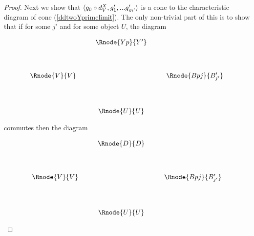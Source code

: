 \documentclass[10pt,a4paper]{scrartcl}
\begin{document}
\begin{proof}
\noindent
Next we show that $\langle g_0 \circ d^{X}_{V},g'_1,...g'_{m'}\rangle$ is a cone to the characteristic diagram of cone (\ref{ddtwoYprimelimit}). The only non-trivial part of this is to show that if for some $j'$ and for some object $U$, the diagram
\begin{center}
\begin{equation}
\label{ddtwoYpdiamond}
\begin{array}{cp{0.3cm}c    p{0.3cm}  c }
               & & \Rnode{Yp}{Y'} & &                                  \\ [1.3cm]
\Rnode{V}{V}   &&                               & & \Rnode{Bpj}{B'_{j'}}   \\ [1.4cm]
               & & \Rnode{U}{U} & &   
\end{array}
\end{equation}
\end{center}

commutes
then the diagram

\begin{center}
\begin{equation}
\label{ddtwoDdiamond}
\begin{array}{cp{0.3cm}c    p{0.3cm}  c }
               & & \Rnode{D}{D} & &                                  \\ [1.3cm]
\Rnode{V}{V}   &&                               & & \Rnode{Bpj}{B'_{j'}}   \\ [1.4cm]
               & & \Rnode{U}{U} & &   
\end{array}
\end{equation}
\end{center}


\end{proof}
\end{document}
